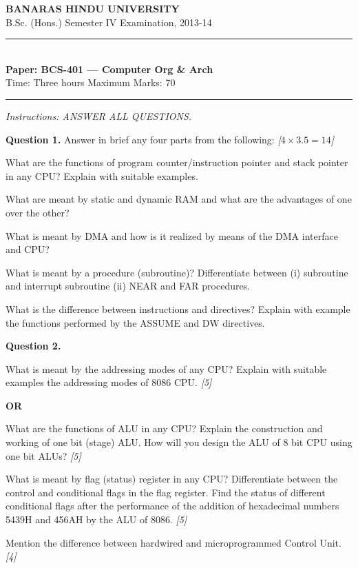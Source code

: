 \documentclass[11pt,a4paper]{article}
\newcommand{\pts}[1]{\hfill   \textit{[#1]}}
\begin{document}
\begin{center}
  {\large\bfseries BANARAS HINDU UNIVERSITY}\\[2pt]
  {
\normalsize B.Sc. (Hons.) Semester IV Examination, 2013-14}\\[6pt]
  \rule{0.8\linewidth}{0.5pt}\\[6pt]
  {\large\bfseries Paper: BCS-401 --- Computer Org \& Arch}\\[4pt]
  {
\normalsize Time: Three hours \hfill Maximum Marks: 70}
\end{center}

\rule{\linewidth}{0.4pt}

\smallskip



\noindent   \textit{Instructions: ANSWER ALL QUESTIONS.}

\bigskip

\medskip


\noindent   \textbf{Question 1.} Answer in brief any four parts from the following: \pts{$4  \times 3.5 = 14$}

\begin{parts}
  \item What are the functions of program counter/instruction pointer and stack pointer in any CPU? Explain with suitable examples.
  \item What are meant by static and dynamic RAM and what are the advantages of one over the other?
  \item What is meant by DMA and how is it realized by means of the DMA interface and CPU?
  \item What is meant by a procedure (subroutine)? Differentiate between (i) subroutine and interrupt subroutine (ii) NEAR and FAR procedures.
  \item What is the difference between instructions and directives? Explain with example the functions performed by the ASSUME and DW directives.
\end{parts}

\medskip


\noindent   \textbf{Question 2.}

\begin{parts}
  \item What is meant by the addressing modes of any CPU? Explain with suitable examples the addressing modes of 8086 CPU. \pts{5}
  \centerline{   \textbf{OR}}
  What are the functions of ALU in any CPU? Explain the construction and working of one bit (stage) ALU. How will you design the ALU of 8 bit CPU using one bit ALUs? \pts{5}
  \item What is meant by flag (status) register in any CPU? Differentiate between the control and conditional flags in the flag register. Find the status of different conditional flags after the performance of the addition of hexadecimal numbers 5439H and 456AH by the ALU of 8086. \pts{5}
  \item Mention the difference between hardwired and microprogrammed Control Unit. \pts{4}
\end{parts}
\end{document}

